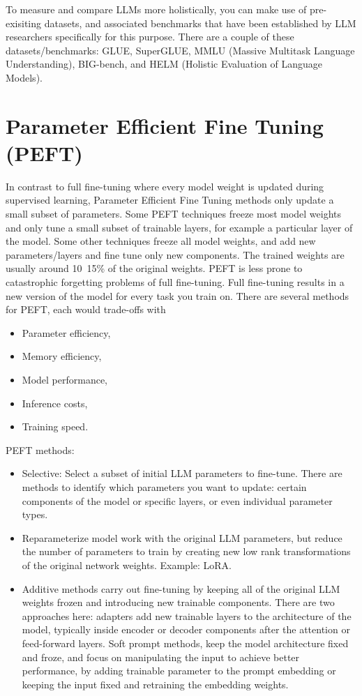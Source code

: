 \documentclass[12pt]{report}
\begin{document}
To measure and compare LLMs more holistically, you can make use of pre-exisiting datasets, and associated benchmarks that have been established by LLM researchers specifically for this purpose. There are a couple of these datasets/benchmarks: GLUE, SuperGLUE, MMLU (Massive Multitask Language Understanding), BIG-bench, and HELM (Holistic Evaluation of Language Models).

\section{Parameter Efficient Fine Tuning (PEFT)}

In contrast to full fine-tuning where every model weight is updated during supervised learning, Parameter Efficient Fine Tuning methods only update a small subset of parameters. Some PEFT techniques freeze most model weights and only tune a small subset of trainable layers, for example a particular layer of the model. Some other techniques freeze all model weights, and add new parameters/layers and fine tune only new components. The trained weights are usually around 10~15\% of the original weights. PEFT is less prone to catastrophic forgetting problems of full fine-tuning. Full fine-tuning results in a new version of the model for every task you train on. There are several methods for PEFT, each would trade-offs with
\begin{itemize}
  \item Parameter efficiency,
  \item Memory efficiency,
  \item Model performance,
  \item Inference costs,
  \item Training speed.
\end{itemize}

PEFT methods:
\begin{itemize}
  \item Selective: Select a subset of initial LLM parameters to fine-tune. There are methods to identify which parameters you want to update: certain components of the model or specific layers, or even individual parameter types.
  \item Reparameterize model work with the original LLM parameters, but reduce the number of parameters to train by creating new low rank transformations of the original network weights. Example: LoRA.
  \item Additive methods carry out fine-tuning by keeping all of the original LLM weights frozen and introducing new trainable components. There are two approaches here: adapters add new trainable layers to the architecture of the model, typically inside encoder or decoder components after the attention or feed-forward layers. Soft prompt methods, keep the model architecture fixed and froze, and focus on manipulating the input to achieve better performance, by adding trainable parameter to the prompt embedding or keeping the input fixed and retraining the embedding weights.
\end{itemize}
\end{document}
